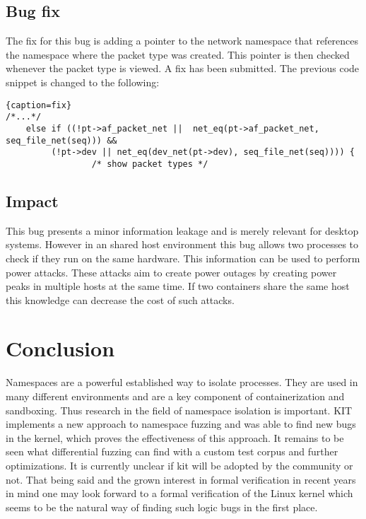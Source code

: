 \documentclass[10pt,twocolumn,a4paper]{article}
\begin{document}
\subsection{Bug fix}
The fix for this bug is adding a pointer to the network namespace that references the namespace
where the packet type was created. This pointer is then checked whenever the packet type is
viewed. A fix has been submitted.\cite{4}
The previous code snippet is changed to the following:
\begin{lstlisting}{caption=fix}
/*...*/
	else if ((!pt->af_packet_net ||  net_eq(pt->af_packet_net, seq_file_net(seq))) &&
		 (!pt->dev || net_eq(dev_net(pt->dev), seq_file_net(seq)))) {
                 /* show packet types */
\end{lstlisting}
\cite{4}
\subsection{Impact}
This bug presents a minor information leakage and is merely relevant for desktop systems.
However in an shared host environment this bug allows two processes to check if they run on the same
hardware. This information can be used to perform power attacks. These attacks aim to create power
outages by creating power peaks in multiple hosts at the same time. If two containers share the same
host this knowledge can decrease the cost of such attacks\cite{7}.
\section{Conclusion}
Namespaces are a powerful established way to isolate processes. They are used in many different
environments 
and are a key component of containerization and sandboxing. Thus research in the field of namespace isolation is
important. KIT implements a new approach to namespace fuzzing and was able to find new bugs in the
kernel, which proves the effectiveness of this approach. It remains to be seen what differential
fuzzing can find with a custom  test corpus and further optimizations. It is currently unclear if
kit will be adopted by the community or not. That being said and the  grown interest in formal
verification in recent years in mind one may look forward to a formal verification of the Linux
kernel which seems to be the natural way of finding such logic bugs in the first place.


\end{document}
